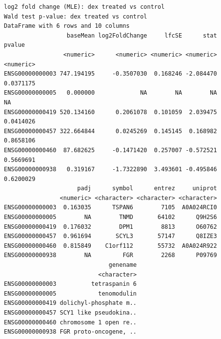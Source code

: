 \documentclass[
  letterpaper,
  DIV=11,
  numbers=noendperiod]{scrartcl}
\newenvironment{Shaded}{\begin{snugshade}}{\end{snugshade}}
\newcommand{\CommentTok}[1]{\textcolor[rgb]{0.37,0.37,0.37}{#1}}
\newcommand{\FunctionTok}[1]{\textcolor[rgb]{0.28,0.35,0.67}{#1}}
\newcommand{\NormalTok}[1]{\textcolor[rgb]{0.00,0.23,0.31}{#1}}
\newcommand{\OtherTok}[1]{\textcolor[rgb]{0.00,0.23,0.31}{#1}}
\newcommand{\SpecialCharTok}[1]{\textcolor[rgb]{0.37,0.37,0.37}{#1}}
\begin{document}
\begin{verbatim}
log2 fold change (MLE): dex treated vs control 
Wald test p-value: dex treated vs control 
DataFrame with 6 rows and 10 columns
                  baseMean log2FoldChange     lfcSE      stat    pvalue
                 <numeric>      <numeric> <numeric> <numeric> <numeric>
ENSG00000000003 747.194195     -0.3507030  0.168246 -2.084470 0.0371175
ENSG00000000005   0.000000             NA        NA        NA        NA
ENSG00000000419 520.134160      0.2061078  0.101059  2.039475 0.0414026
ENSG00000000457 322.664844      0.0245269  0.145145  0.168982 0.8658106
ENSG00000000460  87.682625     -0.1471420  0.257007 -0.572521 0.5669691
ENSG00000000938   0.319167     -1.7322890  3.493601 -0.495846 0.6200029
                     padj      symbol      entrez     uniprot
                <numeric> <character> <character> <character>
ENSG00000000003  0.163035      TSPAN6        7105  A0A024RCI0
ENSG00000000005        NA        TNMD       64102      Q9H2S6
ENSG00000000419  0.176032        DPM1        8813      O60762
ENSG00000000457  0.961694       SCYL3       57147      Q8IZE3
ENSG00000000460  0.815849    C1orf112       55732  A0A024R922
ENSG00000000938        NA         FGR        2268      P09769
                              genename
                           <character>
ENSG00000000003          tetraspanin 6
ENSG00000000005            tenomodulin
ENSG00000000419 dolichyl-phosphate m..
ENSG00000000457 SCY1 like pseudokina..
ENSG00000000460 chromosome 1 open re..
ENSG00000000938 FGR proto-oncogene, ..
\end{verbatim}

\begin{Shaded}
\end{Shaded}
\end{document}
